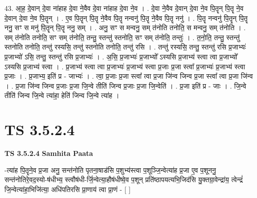 \documentclass[17pt]{extarticle}
\begin{document}
43. आ॒ह॒ दे॒वान् दे॒वा ना॑हाह दे॒वा ने॒वैव दे॒वा ना॑हाह दे॒वा ने॒व । . दे॒वा ने॒वैव दे॒वान् दे॒वा ने॒व पि॒तॄन् पि॒तॄ ने॒व दे॒वान् दे॒वा ने॒व पि॒तॄन् । . ए॒व पि॒तॄन् पि॒तॄ ने॒वैव पि॒तॄ नन्वनु॑ पि॒तॄ ने॒वैव पि॒तॄ ननु॑ । . पि॒तॄ नन्वनु॑ पि॒तॄन् पि॒तॄ ननु॒ सꣳ स मनु॑ पि॒तॄन् पि॒तॄ ननु॒ सम् । . अनु॒ सꣳ स मन्वनु॒ सम् त॑नोति तनोति॒ स मन्वनु॒ सम् त॑नोति । . सम् त॑नोति तनोति॒ सꣳ सम् त॑नोति॒ तन्तु॒ स्तन्तु॑ स्तनोति॒ सꣳ सम् त॑नोति॒ तन्तुः॑ । . त॒नो॒ति॒ तन्तु॒ स्तन्तु॑ स्तनोति तनोति॒ तन्तु॑ रस्यसि॒ तन्तु॑ स्तनोति तनोति॒ तन्तु॑ रसि । . तन्तु॑ रस्यसि॒ तन्तु॒ स्तन्तु॑ रसि प्र॒जाभ्यः॑ प्र॒जाभ्यो॑ ऽसि॒ तन्तु॒ स्तन्तु॑ रसि प्र॒जाभ्यः॑ । . अ॒सि॒ प्र॒जाभ्यः॑ प्र॒जाभ्यो᳚ ऽस्यसि प्र॒जाभ्य॑ स्त्वा त्वा प्र॒जाभ्यो᳚ ऽस्यसि प्र॒जाभ्य॑ स्त्वा । . प्र॒जाभ्य॑ स्त्वा त्वा प्र॒जाभ्यः॑ प्र॒जाभ्य॑ स्त्वा प्र॒जाः प्र॒जा स्त्वा᳚ प्र॒जाभ्यः॑ प्र॒जाभ्य॑ स्त्वा प्र॒जाः । . प्र॒जाभ्य॒ इति॑ प्र - जाभ्यः॑ । . त्वा॒ प्र॒जाः प्र॒जा स्त्वा᳚ त्वा प्र॒जा जि॑न्व जिन्व प्र॒जा स्त्वा᳚ त्वा प्र॒जा जि॑न्व । . प्र॒जा जि॑न्व जिन्व प्र॒जाः प्र॒जा जि॒न्वे तीति॑ जिन्व प्र॒जाः प्र॒जा जि॒न्वेति॑ । . प्र॒जा इति॑ प्र - जाः । . जि॒न्वे तीति॑ जिन्व जि॒न्वे त्या॑हा॒ हेति॑ जिन्व जि॒न्वे त्या॑ह । \newline
\pagebreak
{}

\section{ TS 3.5.2.4 }

\textbf{TS 3.5.2.4 } \newline
\textbf{Samhita Paata} \newline

-त्या॑ह पि॒तॄने॒व प्र॒जा अनु॒ सन्त॑नोति पृतना॒षाड॑सि प॒शुभ्य॑स्त्वा प॒शूञ्जि॒न्वेत्या॑ह प्र॒जा ए॒व प॒शूननु॒ सन्त॑नोतिरे॒वद॒स्यो-ष॑धीभ्य॒ स्त्वौष॑धी-र्जि॒न्वेत्या॒हौष॑धीष्वे॒व प॒शून् प्रति॑ष्ठापयत्यभि॒जिद॑सि यु॒क्तग्रा॒वेन्द्रा॑य॒ त्वेन्द्रं॑ जि॒न्वेत्या॑हा॒भिजि॑त्या॒ अधि॑पतिरसि प्रा॒णाय॑ त्वा प्रा॒णं - [  ] \newline
\end{document}
